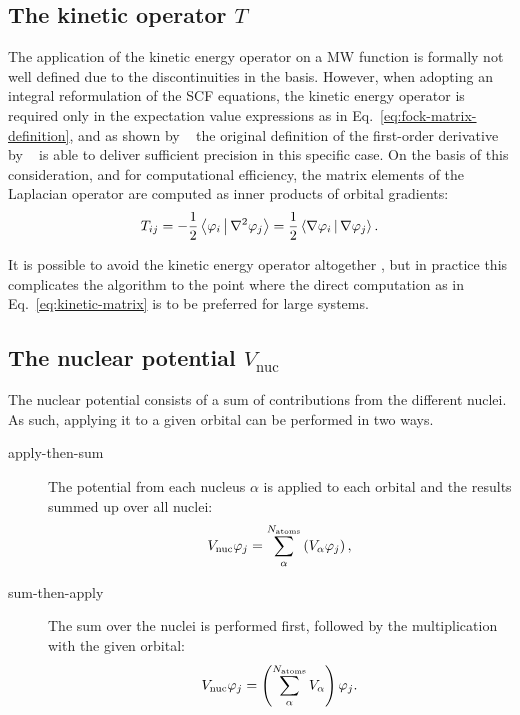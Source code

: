 \documentclass[journal=jctcce, manuscript=suppinfo]{achemso}
\begin{document}
\subsection{The kinetic operator $T$}
\label{sec:compute-T}
The application of the kinetic energy operator on a \ac{MW} function is formally not well defined due to the discontinuities in the basis.\cite{Anderson2019-bx} However, when adopting an integral reformulation of the \ac{SCF} equations, the kinetic energy operator is required only in the  expectation value expressions as in Eq.~\eqref{eq:fock-matrix-definition}, and as shown by \citeauthor{Anderson2019-bx}~\cite{Anderson2019-bx} the original definition of the first-order derivative by \citeauthor{Alpert:2002cx}~\cite{Alpert:2002cx} is able to deliver sufficient precision in this specific case. On the basis of this consideration, and for computational efficiency, the matrix elements of the Laplacian operator are computed as inner products of orbital gradients:
\begin{equation}
  \label{eq:kinetic-matrix}
  T_{ij} = 
  -\frac{1}{2} 
  \Braket{\varphi_i | \nabla^2 \varphi_j} 
  = 
  \frac{1}{2} 
  \Braket{\nabla \varphi_i | \nabla \varphi_j}.
\end{equation}

It is possible to avoid the kinetic energy operator altogether \cite{Jensen:2022gg}, but in practice this complicates the algorithm to the point where the direct computation as in Eq.~\eqref{eq:kinetic-matrix} is to be preferred for large systems.

\subsection{The nuclear potential $V_{\mathrm{nuc}}$}
\label{sec:compute-V}
The nuclear potential consists of a sum of contributions from the different nuclei. As such, applying it to a given orbital can be performed in two ways.

\begin{description}
\item[apply-then-sum] The potential from each nucleus $\alpha$ is applied to each orbital and the results summed up over all nuclei:
\begin{equation}
  V_{\mathrm{nuc}} \varphi_j = \sum_{\alpha}^{N_{\mathrm{atoms}}} \left(V_{\alpha} \varphi_j\right),
\end{equation} 
\item[sum-then-apply] The sum over the nuclei is performed first, followed by the multiplication with the given orbital:
\begin{equation}
V_{\mathrm{nuc}} \varphi_j = \left(\sum_{\alpha}^{N_{\mathrm{atoms}}} V_{\alpha}\right) \varphi_j.
\end{equation}
\end{description}
\end{document}

